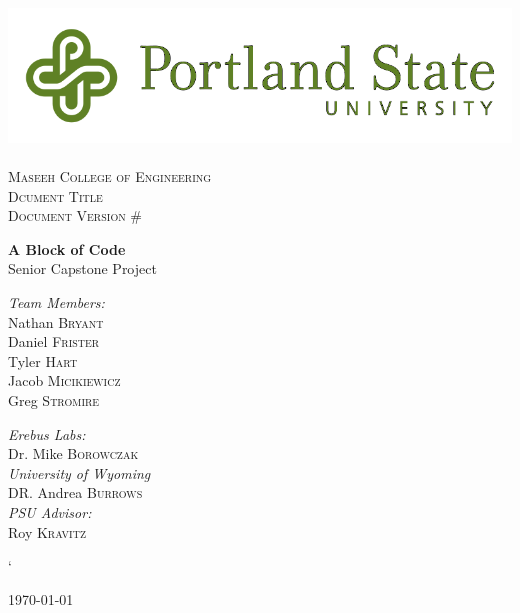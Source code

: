 \documentclass[12pt,a4paper]{report}
\begin{document}
 
\begin{titlepage} 
\begin{center} 
 
\includegraphics[width=.75\textwidth]{./PSU_logo.png}~\\[.5cm] 
 
\textsc{\LARGE \color{PSU} Maseeh College of Engineering}\\[1.5cm] 
 
\textsc{\Large Dcument Title}\\[0.5cm]
\textsc{\Large Document Version \#}\\[0.5cm]
\vspace{1cm} 
 
{ \huge \bfseries\color{PSU} A Block of Code\\[0.4cm] } 
  \large Senior Capstone Project
 
\vspace{2.5cm} 
 \begin{multicols}{2}
    
\begin{flushleft}
\noindent 
 \large 
\emph{\color{PSU}Team Members:}\\ 
Nathan \textsc{Bryant}\\ 
Daniel \textsc{Frister}\\
Tyler  \textsc{Hart}\\
Jacob   \textsc{Micikiewicz}\\
Greg    \textsc{Stromire}\\
\end{flushleft} 

 \begin{flushleft}
  \large 
 \emph{\color{PSU}Erebus Labs:} \\ 
 Dr. Mike  \textsc{Borowczak}\\ 
 \emph{\color{PSU}University of Wyoming}\\
 DR. Andrea \textsc{Burrows}\\ 
 \emph{\color{PSU}PSU Advisor:}\\ 
 Roy \textsc{Kravitz} 
 \end{flushleft}


 \end{multicols}` 
\vfill 
 
{\large \today} 
 
\end{center} 
\end{titlepage} 
 

 
\end{document}
